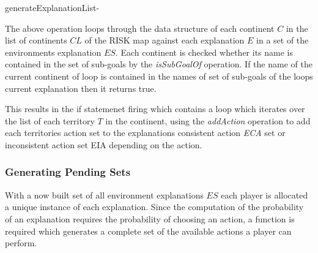 \documentclass[parskip]{cs4rep}
\begin{document}
\begin{pseudocode}[ruled]{generateExplanationList}{-}
\begin{algorithm}[H]
\end{algorithm}
\end{pseudocode}

The above operation loops through the data structure of each continent $C$ in the list of continents $CL$ of the RISK map against each explanation $E$ in a set of the environments explanation $ES$. Each continent is checked whether its name is contained in the set of sub-goals by the \textit{isSubGoalOf} operation. If the name of the current continent of loop is contained in the names of set of sub-goals of the loops current explanation then it returns true. 

This results in the if statemenet firing which contains a loop which iterates over the list of each territory $T$ in the continent, using the \textit{addAction} operation to add each territories action set to the explanations consistent action \textit{ECA} set or inconsistent action set {EIA} depending on the action.

\subsubsection{Generating Pending Sets}

With a now built set of all environment explanations $ES$ each player is allocated a unique instance of each explanation. Since the computation of the probability of an explanation requires the probability of choosing an action, a function is required which generates a complete set of the available actions a player can perform.
\end{document}
